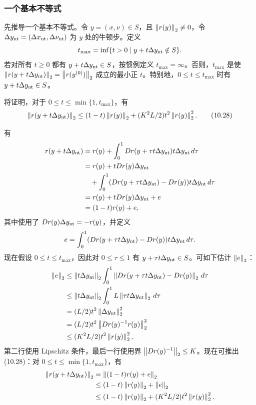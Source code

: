 \subsubsection*{一个基本不等式}
先推导一个基本不等式。令 $y=(x,\nu)\in S$，且 $\left\lVert r(y)\right\rVert_2\ne0$，令 $\Delta y_{\rm nt}=(\Delta x_{\rm nt},\Delta\nu_{\rm nt})$ 为 $y$ 处的牛顿步。定义
\[t_{\max}=\inf\{t>0\mid y+t\Delta y_{\rm nt}\notin S\}.\]
若对所有 $t\ge0$ 都有 $y+t\Delta y_{\rm nt}\in S$，按惯例定义 $t_{\max}=\infty$。否则，$t_{\max}$ 是使 $\left\lVert r(y+t\Delta y_{\rm nt})\right\rVert_2=\left\lVert r(y^{(0)})\right\rVert_2$ 成立的最小正 $t$。特别地，$0\le t\le t_{\max}$ 时有 $y+t\Delta y_{\rm nt}\in S$。

将证明，对于 $0\le t\le\min\{1,t_{\max}\}$，有
\begin{equation}\left\lVert r(y+t\Delta y_{\rm nt})\right\rVert_2\le(1-t)\left\lVert r(y)\right\rVert_2+(K^2L/2)t^2\left\lVert r(y)\right\rVert_2^2.\tag{10.28}\end{equation}

有
\[\begin{aligned}
r(y+t\Delta y_{\rm nt})
&=r(y)+\int_0^1 Dr(y+\tau t\Delta y_{\rm nt})t\Delta y_{\rm nt}\,d\tau\\
&=r(y)+tDr(y)\Delta y_{\rm nt}\\
&\quad+\int_0^1(Dr(y+\tau t\Delta y_{\rm nt})-Dr(y))t\Delta y_{\rm nt}\,d\tau\\
&=r(y)+tDr(y)\Delta y_{\rm nt}+e\\
&=(1-t)r(y)+e,
\end{aligned}\]
其中使用了 $Dr(y)\Delta y_{\rm nt}=-r(y)$，并定义
\[e=\int_0^1(Dr(y+\tau t\Delta y_{\rm nt})-Dr(y))t\Delta y_{\rm nt}\,d\tau.\]
现在假设 $0\le t\le t_{\max}$，因此对 $0\le\tau\le1$ 有 $y+\tau t\Delta y_{\rm nt}\in S$。可如下估计 $\left\lVert e\right\rVert_2$：
\[\begin{aligned}
\left\lVert e\right\rVert_2&\le\left\lVert t\Delta y_{\rm nt}\right\rVert_2\int_0^1\left\lVert Dr(y+\tau t\Delta y_{\rm nt})-Dr(y)\right\rVert_2\,d\tau\\
&\le\left\lVert t\Delta y_{\rm nt}\right\rVert_2\int_0^1L\left\lVert \tau t\Delta y_{\rm nt}\right\rVert_2\,d\tau\\
&=(L/2)t^2\left\lVert \Delta y_{\rm nt}\right\rVert_2^2\\
&=(L/2)t^2\left\lVert Dr(y)^{-1}r(y)\right\rVert_2^2\\
&\le(K^2L/2)t^2\left\lVert r(y)\right\rVert_2^2,
\end{aligned}\]
第二行使用 Lipschitz 条件，最后一行使用界 $\left\lVert Dr(y)^{-1}\right\rVert_2\le K$。现在可推出 (10.28)：对 $0\le t\le\min\{1,t_{\max}\}$，有
\[\begin{aligned}
\left\lVert r(y+t\Delta y_{\rm nt})\right\rVert_2&=\left\lVert (1-t)r(y)+e\right\rVert_2\\
&\le(1-t)\left\lVert r(y)\right\rVert_2+\left\lVert e\right\rVert_2\\
&\le(1-t)\left\lVert r(y)\right\rVert_2+(K^2L/2)t^2\left\lVert r(y)\right\rVert_2^2.
\end{aligned}\]

